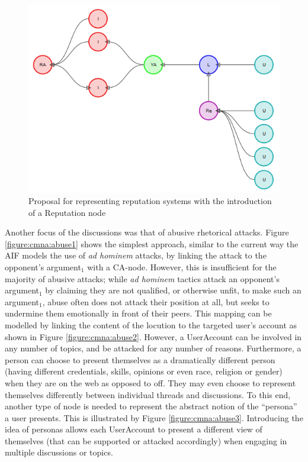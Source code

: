 \begin{figure}
\centering
\includegraphics[scale=\scaleProps]{./figures/cmna_proposals/likes1.png}
\caption{Proposal for representing reputation systems with the introduction of a Reputation node}
\label{figure:cmna:likes1}
\end{figure}


Another focus of the discussions was that of abusive rhetorical attacks.
Figure \ref{figure:cmna:abuse1} shows the simplest approach, similar to the current way the AIF models the use of \textit{ad hominem} attacks, by linking the attack to the opponent's argument$_1$ with a CA-node. However, this is insufficient for the majority of abusive attacks; while \textit{ad hominem} tactics attack an opponent's argument$_1$ by claiming they are not qualified, or otherwise unfit, to make such an argument$_1$, abuse often does not attack their position at all, but seeks to undermine them emotionally in front of their peers. This mapping can be modelled by linking the content of the locution to the targeted user's account as shown in Figure \ref{figure:cmna:abuse2}. However, a UserAccount can be involved in any number of topics, and be attacked for any number of reasons. Furthermore, a person can choose to present themselves as a dramatically different person (having different credentials, skills, opinions or even race, religion or gender) when they are on the web as opposed to off. They may even choose to represent themselves differently between individual threads and discussions. To this end, another type of node is needed to represent the abstract notion of the ``persona'' a user presents. This is illustrated by Figure \ref{figure:cmna:abuse3}. Introducing the idea of personas allows each UserAccount to present a different view of themselves (that can be supported or attacked accordingly) when engaging in multiple discussions or topics.


